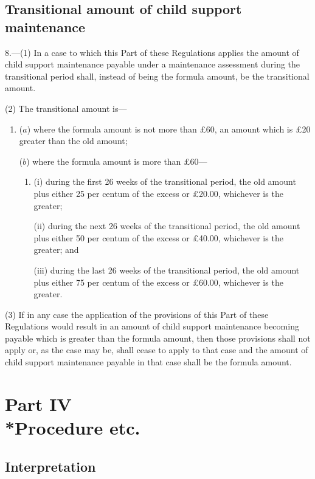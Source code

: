 \documentclass[12pt,a4paper]{article}
\begin{document}
\subsection[8. Transitional amount of child support maintenance]{Transitional amount of child support maintenance}

8.—(1) In a case to which this Part of these Regulations applies the amount of child support maintenance payable under a maintenance assessment during the transitional period shall, instead of being the formula amount, be the transitional amount.

(2) The transitional amount is—
\begin{enumerate}\item[]
($a$) where the formula amount is not more than £60, an amount which is £20 greater than the old amount;

($b$) where the formula amount is more than £60—
\begin{enumerate}\item[]
(i) during the first 26 weeks of the transitional period, the old amount plus either 25 per centum of the excess or £20.00, whichever is the greater;

(ii) during the next 26 weeks of the transitional period, the old amount plus either 50 per centum of the excess or £40.00, whichever is the greater; and

(iii) during the last 26 weeks of the transitional period, the old amount plus either 75 per centum of the excess or £60.00, whichever is the greater.
\end{enumerate}
\end{enumerate}

(3) If in any case the application of the provisions of this Part of these Regulations would result in an amount of child support maintenance becoming payable which is greater than the formula amount, then those provisions shall not apply or, as the case may be, shall cease to apply to that case and the amount of child support maintenance payable in that case shall be the formula amount.

\section[Part IV --- Procedure etc.]{Part IV\\*Procedure etc.}

\renewcommand\parthead{--- Part IV}

\subsection[9. Interpretation]{Interpretation}
\end{document}
